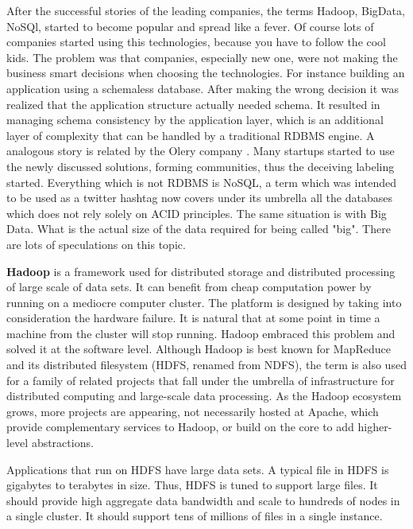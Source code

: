 After the successful stories of the leading companies, the terms Hadoop, BigData, NoSQl, started to become popular and spread like a fever. Of course lots of companies started using this technologies, because you have to follow the cool kids. The problem was that companies, especially new one, were not making the business smart decisions when choosing the technologies. For instance building an application using a schemaless database. After making the wrong decision it was realized that the application structure actually needed schema. It resulted in managing schema consistency by the application layer, which is an additional layer of complexity that can be handled by a traditional RDBMS engine. A analogous story is related by the Olery company \cite{mongo_to_postgres}. Many startups started to use the newly discussed solutions, forming communities, thus the deceiving labeling started. Everything which is not RDBMS is NoSQL, a term which was intended to be used as a twitter hashtag now covers under its umbrella all the databases which does not rely solely on ACID principles. The same situation is with Big Data. What is the actual size of the data required for being called "big". There are lots of speculations on this topic.

\textbf{Hadoop} is a framework used for distributed storage and distributed processing of large scale of data sets. It can benefit from cheap computation power by running on a mediocre computer cluster. The platform is designed by taking into consideration the hardware failure. It is natural that at some point in time a machine from the cluster will stop running. Hadoop embraced this problem and solved it at the software level. Although Hadoop is best known for MapReduce and its distributed filesystem (HDFS, renamed from NDFS), the term is also used for a family of related projects that fall under the umbrella of infrastructure for distributed computing and large-scale data processing. As the Hadoop ecosystem grows, more projects are appearing, not necessarily hosted at Apache, which provide complementary services to Hadoop, or build on the core to add higher-level abstractions.

Applications that run on HDFS have large data sets. A typical file in HDFS is gigabytes to terabytes in size. Thus, HDFS is tuned to support large files. It should provide high aggregate data bandwidth and scale to hundreds of nodes in a single cluster. It should support tens of millions of files in a single instance.

